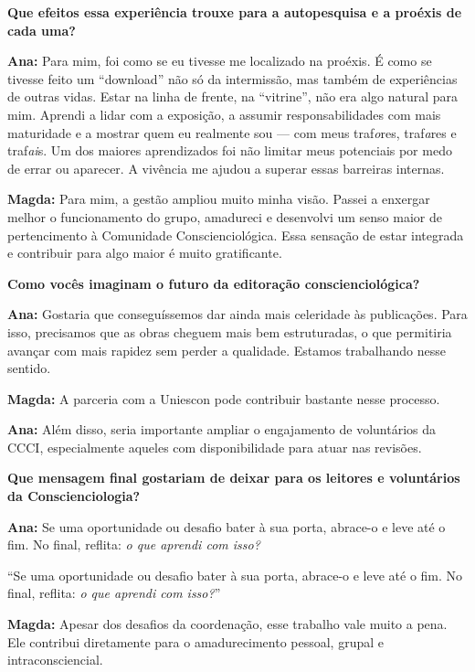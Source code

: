 \documentclass{gescons}
\begin{document}
\begin{multicols}{2}
\textbf{Que efeitos essa experiência trouxe para a autopesquisa e a proéxis de cada uma?}

\textbf{Ana:} Para mim, foi como se eu tivesse me localizado na proéxis. É como se tivesse feito um ``download'' não só da intermissão, mas também de experiências de outras vidas. Estar na linha de frente, na ``vitrine'', não era algo natural para mim. Aprendi a lidar com a exposição, a assumir responsabilidades com mais maturidade e a mostrar quem eu realmente sou --- com meus traf\emph{o}res, traf\emph{a}res e traf\emph{ai}s. Um dos maiores aprendizados foi não limitar meus potenciais por medo de errar ou aparecer. A vivência me ajudou a superar essas barreiras internas.

\textbf{Magda:} Para mim, a gestão ampliou muito minha visão. Passei a enxergar melhor o funcionamento do grupo, amadureci e desenvolvi um senso maior de pertencimento à Comunidade Conscienciológica. Essa sensação de estar integrada e contribuir para algo maior é muito gratificante.

\textbf{Como vocês imaginam o futuro da editoração conscienciológica?}

\textbf{Ana:} Gostaria que conseguíssemos dar ainda mais celeridade às publicações. Para isso, precisamos que as obras cheguem mais bem estruturadas, o que permitiria avançar com mais rapidez sem perder a qualidade. Estamos trabalhando nesse sentido.

\textbf{Magda:} A parceria com a Uniescon pode contribuir bastante nesse processo.

\textbf{Ana:} Além disso, seria importante ampliar o engajamento de voluntários da CCCI, especialmente aqueles com disponibilidade para atuar nas revisões.

\textbf{Que mensagem final gostariam de deixar para os leitores e voluntários da Conscienciologia?}

\textbf{Ana:} Se uma oportunidade ou desafio bater à sua porta, abrace-o e leve até o fim. No final, reflita: \emph{o que aprendi com isso?}

\begin{pullquote}
``Se uma oportunidade ou desafio bater à sua porta, abrace-o e leve até o fim. No final, reflita: \emph{o que aprendi com isso?}''
\end{pullquote}

\textbf{Magda:} Apesar dos desafios da coordenação, esse trabalho vale muito a pena. Ele contribui diretamente para o amadurecimento pessoal, grupal e intraconsciencial.


\end{multicols}
\end{document}
